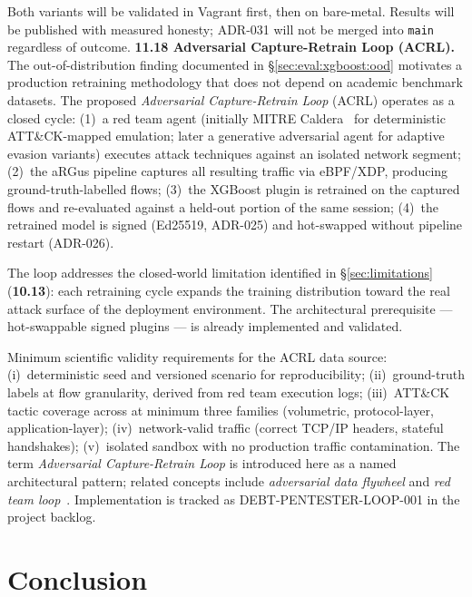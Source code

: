 \documentclass[11pt,a4paper]{article}
\begin{document}
    Both variants will be validated in Vagrant first, then on bare-metal. Results
    will be published with measured honesty; ADR-031 will not be merged into
    \texttt{main} regardless of outcome.
    \textbf{11.18 Adversarial Capture-Retrain Loop (ACRL).}
    \label{sec:future:acrl}
    The out-of-distribution finding documented in \S\ref{sec:eval:xgboost:ood} motivates
    a production retraining methodology that does not depend on academic benchmark datasets.
    The proposed \emph{Adversarial Capture-Retrain Loop} (ACRL) operates as a closed cycle:
    (1)~a red team agent (initially MITRE Caldera~\cite{caldera2024} for deterministic
    ATT\&CK-mapped emulation; later a generative adversarial agent for adaptive evasion
    variants) executes attack techniques against an isolated network segment;
    (2)~the aRGus pipeline captures all resulting traffic via eBPF/XDP, producing
    ground-truth-labelled flows;
    (3)~the XGBoost plugin is retrained on the captured flows and re-evaluated against
    a held-out portion of the same session;
    (4)~the retrained model is signed (Ed25519, ADR-025) and hot-swapped without pipeline
    restart (ADR-026).

    The loop addresses the closed-world limitation identified in \S\ref{sec:limitations}
    (\textbf{10.13}): each retraining cycle expands the training distribution toward the
    real attack surface of the deployment environment. The architectural prerequisite ---
    hot-swappable signed plugins --- is already implemented and validated.

    Minimum scientific validity requirements for the ACRL data source: (i)~deterministic
    seed and versioned scenario for reproducibility; (ii)~ground-truth labels at flow
    granularity, derived from red team execution logs; (iii)~ATT\&CK tactic coverage
    across at minimum three families (volumetric, protocol-layer, application-layer);
    (iv)~network-valid traffic (correct TCP/IP headers, stateful handshakes);
    (v)~isolated sandbox with no production traffic contamination.
    The term \emph{Adversarial Capture-Retrain Loop} is introduced here as a named
    architectural pattern; related concepts include \emph{adversarial data flywheel}
    and \emph{red team loop}~\cite{sommer2010}. Implementation is tracked as
    DEBT-PENTESTER-LOOP-001 in the project backlog.

    \section{Conclusion}
\end{document}
